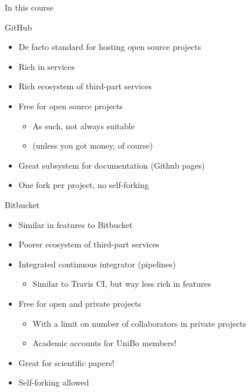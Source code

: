 \documentclass[presentation]{beamer}
\begin{document}
\begin{frame}[allowframebreaks]{In this course}
    \begin{block}{GitHub}
        \begin{itemize}
            \item De facto standard for hosting open source projects
            \item Rich in services
            \item Rich ecosystem of third-part services
            \item Free for open source projects
            \begin{itemize}
                \item As such, not always suitable
                \item (unless you got money, of course)
            \end{itemize}
            \item Great subsystem for documentation (Github pages)
            \item One fork per project, no self-forking
        \end{itemize}
    \end{block}
    \begin{block}{Bitbucket}
        \begin{itemize}
            \item Similar in features to Bitbucket
            \item Poorer ecosystem of third-part services
            \item Integrated continuous integrator (pipelines)
            \begin{itemize}
                \item Similar to Travis CI, but way less rich in features
            \end{itemize}
            \item Free for open and private projects
            \begin{itemize}
                \item With a limit on number of collaborators in private projects
                \item Academic accounts for UniBo members!
            \end{itemize}
            \item Great for scientific papers!
            \item Self-forking allowed
        \end{itemize}
    \end{block}
\end{frame}
\end{document}
